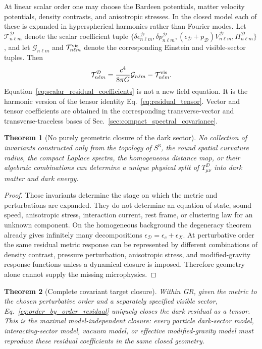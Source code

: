 \documentclass[
  aps,
  prd,
  reprint,
  superscriptaddress,
  nofootinbib,
  floatfix,
  longbibliography
]{revtex4-2}
\theoremstyle{plain}
\newtheorem{theorem}{Theorem}[section]
\theoremstyle{definition}
\theoremstyle{remark}
\newcommand{\D}{\mathcal D}
\begin{document}
At linear scalar order one may choose the Bardeen potentials, matter velocity
potentials, density contrasts, and anisotropic stresses.  In the closed model
each of these is expanded in hyperspherical harmonics rather than Fourier
modes.  Let $\mathcal T^\D_{n\ell m}$ denote the scalar coefficient tuple
$\{\delta\epsilon^\D_{n\ell m},\delta p^\D_{n\ell m},
(\epsilon_\D+p_\D)V^\D_{n\ell m},\Pi^\D_{n\ell m}\}$, and let
$\mathcal G_{n\ell m}$ and $\mathcal T^{\rm vis}_{n\ell m}$ denote the
corresponding Einstein and visible-sector tuples.  Then
\begin{equation}
\mathcal T^\D_{n\ell m}
=\frac{c^4}{8\pi G}\mathcal G_{n\ell m}
-\mathcal T^{\rm vis}_{n\ell m}.
\label{eq:scalar_residual_coefficients}
\end{equation}
Equation~\eqref{eq:scalar_residual_coefficients} is not a new field equation.
It is the harmonic version of the tensor identity
Eq.~\eqref{eq:residual_tensor}.  Vector and tensor coefficients are obtained in
the corresponding transverse-vector and transverse-traceless bases of
Sec.~\ref{sec:compact_spectral_covariance}.

\begin{theorem}[No purely geometric closure of the dark sector]
No collection of invariants constructed only from the topology of $S^3$, the
round spatial curvature radius, the compact Laplace spectra, the homogeneous
distance map, or their algebraic combinations can determine a unique physical
split of $T^\D_{\mu\nu}$ into dark matter and dark energy.
\end{theorem}

\begin{proof}
Those invariants determine the stage on which the metric and perturbations are
expanded.  They do not determine an equation of state, sound speed, anisotropic
stress, interaction current, rest frame, or clustering law for an unknown
component.  On the homogeneous background the degeneracy theorem already gives
infinitely many decompositions
$\epsilon_\D=\epsilon_c+\epsilon_X$.  At perturbative order the same residual
metric response can be represented by different combinations of density
contrast, pressure perturbation, anisotropic stress, and modified-gravity
response functions unless a dynamical closure is imposed.  Therefore geometry
alone cannot supply the missing microphysics.
\end{proof}

\begin{theorem}[Complete covariant target closure]
Within GR, given the metric to the chosen perturbative order and a separately
specified visible sector, Eq.~\eqref{eq:order_by_order_residual} uniquely
closes the dark residual as a tensor.  This is the maximal model-independent
closure: every particle dark-sector model, interacting-sector model, vacuum
model, or effective modified-gravity model must reproduce these residual
coefficients in the same closed geometry.
\end{theorem}
\end{document}
